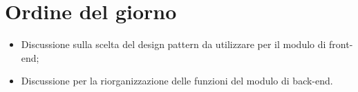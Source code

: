 \section{Ordine del giorno}
\begin{itemize}
\item Discussione sulla scelta del design pattern da utilizzare per il modulo di front-end;
\item Discussione per la riorganizzazione delle funzioni del modulo di back-end.
\end{itemize}